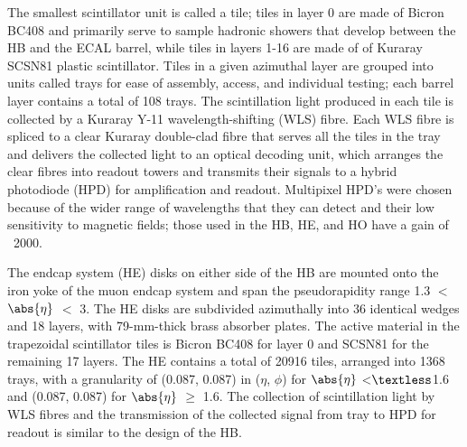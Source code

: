 The smallest scintillator unit is called a tile; tiles in layer 0 are made of Bicron BC408 and primarily serve to sample hadronic showers that develop between the HB and the ECAL barrel, while tiles in layers 1-16 are made of of Kuraray SCSN81 plastic scintillator. Tiles in a given azimuthal layer are grouped into units called trays for ease of assembly, access, and individual testing; each barrel layer contains a total of 108 trays. The scintillation light produced in each tile is collected by a Kuraray Y-11 wavelength-shifting (WLS) fibre. Each WLS fibre is spliced to a clear Kuraray double-clad fibre that serves all the tiles in the tray and delivers the collected light to an optical decoding unit, which arranges the clear fibres into readout towers and transmits their signals to a hybrid photodiode (HPD) for amplification and readout. Multipixel HPD's were chosen because of the wider range of wavelengths that they can detect and their low sensitivity to magnetic fields; those used in the HB, HE, and HO have a gain of ~2000.

The endcap system (HE) disks on either side of the HB are mounted onto the iron yoke of the muon endcap system and span the pseudorapidity range 1.3 $<$ $\abs{\eta}$ $<$ 3. The HE disks are subdivided azimuthally into 36 identical wedges and 18 layers, with 79-mm-thick brass absorber plates. The active material in the trapezoidal scintillator tiles is Bicron BC408 for layer 0 and SCSN81 for the remaining 17 layers. The HE contains a total of 20916 tiles, arranged into 1368 trays, with a granularity of (0.087, 0.087) in ($\eta$, $\phi$) for $\abs{\eta}$ <$\textless$1.6 and (0.087, 0.087) for $\abs{\eta}$ $\geq$ 1.6. The collection of scintillation light by WLS fibres and the transmission of the collected signal from tray to HPD for readout is similar to the design of the HB.

